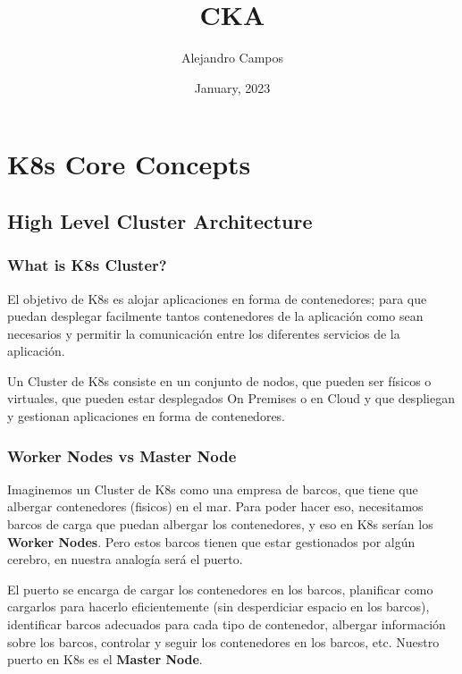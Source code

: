 \documentclass{article}
\title{\textbf{CKA}}
\author{Alejandro Campos}
\date{January, 2023}
\begin{document}
\maketitle
\newpage
\tableofcontents

\newpage
\section{K8s Core Concepts}

\subsection{High Level Cluster Architecture}

\subsubsection{What is K8s Cluster?}

El objetivo de K8s es alojar aplicaciones en forma de contenedores; para que puedan desplegar facilmente tantos contenedores de la aplicación como sean necesarios y permitir la comunicación entre los diferentes servicios de la aplicación.

Un Cluster de K8s consiste en un conjunto de nodos, que pueden ser físicos o virtuales, que pueden estar desplegados On Premises o en Cloud y que despliegan y gestionan aplicaciones en forma de contenedores.

\subsubsection{Worker Nodes vs Master Node}

Imaginemos un Cluster de K8s como una empresa de barcos, que tiene que albergar contenedores (fisicos) en el mar. Para poder hacer eso, necesitamos barcos de carga que puedan albergar los contenedores, y eso en K8s serían los \textbf{Worker Nodes}. Pero estos barcos tienen que estar gestionados por algún cerebro, en nuestra analogía será el puerto. 

El puerto se encarga de cargar los contenedores en los barcos, planificar como cargarlos para hacerlo eficientemente (sin desperdiciar espacio en los barcos), identificar barcos adecuados para cada tipo de contenedor, albergar información sobre los barcos, controlar y seguir los contenedores en los barcos, etc. Nuestro puerto en K8s es el \textbf{Master Node}.
\end{document}

